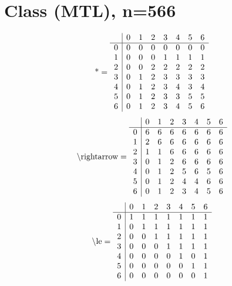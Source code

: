 \documentclass[11pt]{article}
\begin{document}
\section{Class (MTL), n=566}
\[\text{*} = 
\begin{array}{r | r r r r r r r}
 & 0 & 1 & 2 & 3 & 4 & 5 & 6 \\ \hline
0 & 0 & 0 & 0 & 0 & 0 & 0 & 0 \\
1 & 0 & 0 & 0 & 1 & 1 & 1 & 1 \\
2 & 0 & 0 & 2 & 2 & 2 & 2 & 2 \\
3 & 0 & 1 & 2 & 3 & 3 & 3 & 3 \\
4 & 0 & 1 & 2 & 3 & 4 & 3 & 4 \\
5 & 0 & 1 & 2 & 3 & 3 & 5 & 5 \\
6 & 0 & 1 & 2 & 3 & 4 & 5 & 6 \\
\end{array}
\]
\[\text{\textbackslash rightarrow} = 
\begin{array}{r | r r r r r r r}
 & 0 & 1 & 2 & 3 & 4 & 5 & 6 \\ \hline
0 & 6 & 6 & 6 & 6 & 6 & 6 & 6 \\
1 & 2 & 6 & 6 & 6 & 6 & 6 & 6 \\
2 & 1 & 1 & 6 & 6 & 6 & 6 & 6 \\
3 & 0 & 1 & 2 & 6 & 6 & 6 & 6 \\
4 & 0 & 1 & 2 & 5 & 6 & 5 & 6 \\
5 & 0 & 1 & 2 & 4 & 4 & 6 & 6 \\
6 & 0 & 1 & 2 & 3 & 4 & 5 & 6 \\
\end{array}
\]
\[\text{\textbackslash le} = 
\begin{array}{r | r r r r r r r}
 & 0 & 1 & 2 & 3 & 4 & 5 & 6 \\ \hline
0 & 1 & 1 & 1 & 1 & 1 & 1 & 1 \\
1 & 0 & 1 & 1 & 1 & 1 & 1 & 1 \\
2 & 0 & 0 & 1 & 1 & 1 & 1 & 1 \\
3 & 0 & 0 & 0 & 1 & 1 & 1 & 1 \\
4 & 0 & 0 & 0 & 0 & 1 & 0 & 1 \\
5 & 0 & 0 & 0 & 0 & 0 & 1 & 1 \\
6 & 0 & 0 & 0 & 0 & 0 & 0 & 1 \\
\end{array}
\]
\end{document}

